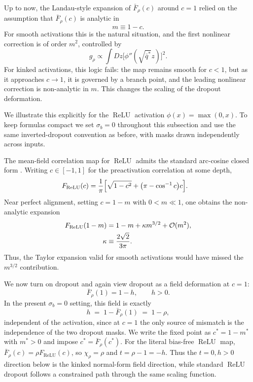 \documentclass{article}
\DeclareMathOperator{\ReLU}{ReLU}
\newcommand{\relu}{\ensuremath{\ReLU}}
\theoremstyle{plain}
\theoremstyle{definition}
\theoremstyle{remark}
\begin{document}
Up to now, the Landau-style expansion of \(\bar F_\rho(c)\) around \(c=1\) relied on the assumption that \(\bar F_\rho(c)\) is analytic in
\relax
\begin{equation}
m \equiv 1-c.
\end{equation}
\relax
For smooth activations this is the natural situation, and the first nonlinear correction is of order \(m^2\), controlled by
\relax
\begin{equation}
g_\rho \propto \int Dz \bigl[\phi''(\sqrt{\bar q^{*}} z)\bigr]^2.
\end{equation}
\relax
For kinked activations, this logic fails: the map remains smooth for \(c<1\), but as it approaches \(c\to 1\), it is governed by a branch point, and the leading nonlinear correction is non-analytic in \(m\). This changes the scaling of the dropout deformation.

We illustrate this explicitly for the \relu{} activation \(\phi(x)=\max(0,x)\). To keep formulas compact we set \(\sigma_b = 0\)
throughout this subsection and use the same inverted-dropout convention as before, with masks drawn independently across inputs.

The mean-field correlation map for \relu{} admits the standard arc-cosine closed form \cite{ChoSaul2009ArcCosine}. Writing \(c\in[-1,1]\) for the preactivation correlation at some depth,
\relax
\begin{align}
F_{\ReLU}(c) &= \frac{1}{\pi} \Bigl[ \sqrt{1-c^{2}} + \bigl(\pi-\cos^{-1}c\bigr)c \Bigr].
\label{eq:relu_map_rho1}
\end{align}
\relax
Near perfect alignment, setting \(c=1-m\) with \(0<m\ll 1\), one obtains the non-analytic expansion
\relax
\begin{align}
F_{\ReLU}(1-m) &= 1-m+\kappa m^{3/2}+{\cal O}(m^{2}),
\label{eq:relu_expand}\\
\kappa &\equiv \frac{2\sqrt{2}}{3\pi}. \nonumber
\end{align}
\relax
Thus, the Taylor expansion valid for smooth activations would have missed the \(m^{3/2}\) contribution. 

We now turn on dropout and again view dropout as a field deformation at \(c=1\):
\relax
\begin{equation}
\bar F_\rho(1)=1-h, \qquad h>0.
\end{equation}
\relax
In the present \(\sigma_b=0\) setting, this field is exactly
\relax
\begin{equation}
h \;=\; 1-\bar F_\rho(1) \;=\; 1-\rho,
\label{eq:relu_h_correct}
\end{equation}
\relax
independent of the activation, since at \(c=1\) the only source of mismatch is the independence of the two dropout masks.
We write the fixed point as \(c^*=1-m^*\) with \(m^*>0\) and impose \(c^*=\bar F_\rho(c^*)\).
For the literal bias-free \relu{} map, \(\bar F_\rho(c)=\rho F_{\ReLU}(c)\), so \(\chi_\rho=\rho\) and \(t=\rho-1=-h\). Thus the \(t=0,h>0\) direction below is the kinked normal-form field direction, while standard \relu{} dropout follows a constrained path through the same scaling function.
\end{document}
